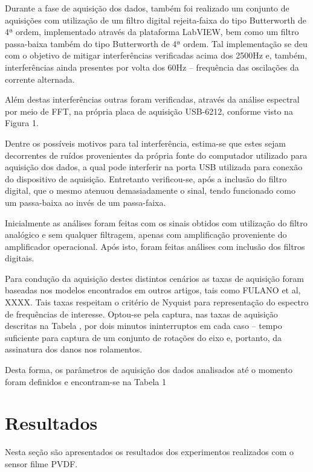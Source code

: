 \documentclass[
	12pt,				
	oneside,			
	a4paper,			
	english,			
	brazil,			
	]{abntex2ppgsi}
\begin{document}
Durante a fase de aquisição dos dados, também foi realizado um conjunto de aquisições com utilização de um filtro digital rejeita-faixa do tipo Butterworth de 4ª ordem, implementado através da plataforma LabVIEW, bem como um filtro passa-baixa também do tipo Butterworth de 4ª ordem. Tal implementação se deu com o objetivo de mitigar interferências verificadas acima dos 2500Hz e, também, interferências ainda presentes por volta dos 60Hz – frequência das oscilações da corrente alternada. 

Além destas interferências outras foram verificadas, através da análise espectral por meio de FFT, na própria placa de aquisição USB-6212, conforme visto na Figura 1.

Dentre os possíveis motivos para tal interferência, estima-se que estes sejam decorrentes de ruídos provenientes da própria fonte do computador utilizado para aquisição dos dados, a qual pode interferir na porta USB utilizada para conexão do dispositivo de aquisição. Entretanto verificou-se, após a inclusão do filtro digital, que o mesmo atenuou demasiadamente o sinal, tendo funcionado como um passa-baixa ao invés de um passa-faixa. 

Inicialmente as análises foram feitas com os sinais obtidos com utilização do filtro analógico e sem qualquer filtragem, apenas com amplificação proveniente do amplificador operacional. Após isto, foram feitas análises com inclusão dos filtros digitais. 

Para condução da aquisição destes distintos cenários as taxas de aquisição foram baseadas nos modelos encontrados em outros artigos, tais como FULANO et al, XXXX. Tais taxas respeitam o critério de Nyquist para representação do espectro de frequências de interesse. Optou-se pela captura, nas taxas de aquisição descritas na Tabela , por dois minutos ininterruptos em cada caso – tempo suficiente para captura de um conjunto de rotações do eixo e, portanto, da assinatura dos danos nos rolamentos. 

Desta forma, os parâmetros de aquisição dos dados analisados até o momento foram definidos e encontram-se na Tabela 1

\chapter{Resultados}

Nesta seção são apresentados os resultados dos experimentos realizados com o sensor filme PVDF.

\section{}
\end{document}
